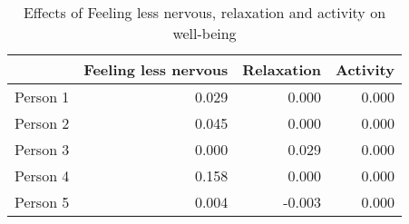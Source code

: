 \begin{table}[ht]
\centering
\begin{tabular}{rrrr}
  \toprule
 & Feeling less nervous & Relaxation & Activity \\ 
  \midrule
Person 1 & 0.029 & 0.000 & 0.000 \\ 
  Person 2 & 0.045 & 0.000 & 0.000 \\ 
  Person 3 & 0.000 & 0.029 & 0.000 \\ 
  Person 4 & 0.158 & 0.000 & 0.000 \\ 
  Person 5 & 0.004 & -0.003 & 0.000 \\ 
   \bottomrule
\end{tabular}
\caption{Effects of Feeling less nervous, relaxation and activity on well-being} 
\label{tab:effects_in_aira}
\end{table}
